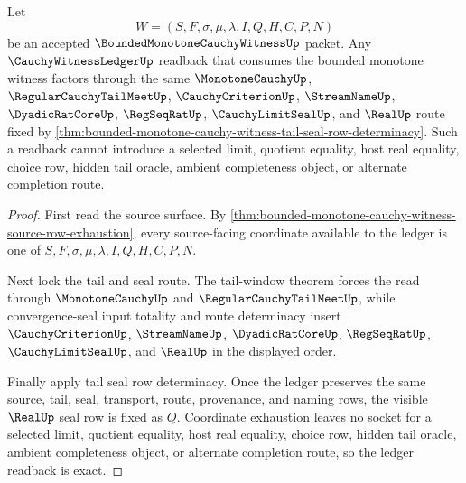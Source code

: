 \begin{theorem}
\label{thm:bounded-monotone-cauchy-witness-cauchy-ledger-readback-exactness}
Let
$$
W=(S,F,\sigma,\mu,\lambda,I,Q,H,C,P,N)
$$
be an accepted $\BoundedMonotoneCauchyWitnessUp$ packet. Any $\CauchyWitnessLedgerUp$ readback that consumes the bounded monotone witness factors through the same $\MonotoneCauchyUp$, $\RegularCauchyTailMeetUp$, $\CauchyCriterionUp$, $\StreamNameUp$, $\DyadicRatCoreUp$, $\RegSeqRatUp$, $\CauchyLimitSealUp$, and $\RealUp$ route fixed by \autoref{thm:bounded-monotone-cauchy-witness-tail-seal-row-determinacy}. Such a readback cannot introduce a selected limit, quotient equality, host real equality, choice row, hidden tail oracle, ambient completeness object, or alternate completion route.
\end{theorem}
\begin{proof}
First read the source surface. By \autoref{thm:bounded-monotone-cauchy-witness-source-row-exhaustion}, every source-facing coordinate available to the ledger is one of $S,F,\sigma,\mu,\lambda,I,Q,H,C,P,N$.

Next lock the tail and seal route. The tail-window theorem forces the read through $\MonotoneCauchyUp$ and $\RegularCauchyTailMeetUp$, while convergence-seal input totality and route determinacy insert $\CauchyCriterionUp$, $\StreamNameUp$, $\DyadicRatCoreUp$, $\RegSeqRatUp$, $\CauchyLimitSealUp$, and $\RealUp$ in the displayed order.

Finally apply tail seal row determinacy. Once the ledger preserves the same source, tail, seal, transport, route, provenance, and naming rows, the visible $\RealUp$ seal row is fixed as $Q$. Coordinate exhaustion leaves no socket for a selected limit, quotient equality, host real equality, choice row, hidden tail oracle, ambient completeness object, or alternate completion route, so the ledger readback is exact.
\end{proof}

